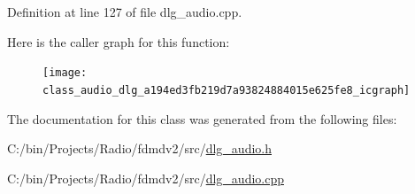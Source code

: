 Definition at line 127 of file dlg\-\_\-audio.\-cpp.



Here is the caller graph for this function\-:
\nopagebreak
\begin{figure}[H]
\begin{center}
\leavevmode
\texttt{[image: class\_audio\_dlg\_a194ed3fb219d7a93824884015e625fe8\_icgraph]}
\end{center}
\end{figure}




The documentation for this class was generated from the following files\-:\begin{DoxyCompactItemize}
\item 
C\-:/bin/\-Projects/\-Radio/fdmdv2/src/\hyperlink{dlg__audio_8h}{dlg\-\_\-audio.\-h}\item 
C\-:/bin/\-Projects/\-Radio/fdmdv2/src/\hyperlink{dlg__audio_8cpp}{dlg\-\_\-audio.\-cpp}\end{DoxyCompactItemize}
